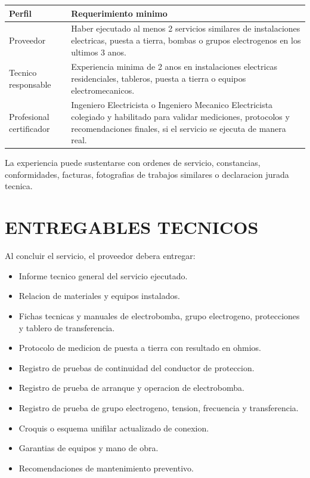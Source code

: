 \documentclass[12pt,letterpaper]{report}
\newcommand{\reqheader}{\rowcolor{modelblue!14}}
\begin{document}
\begin{table}[H]
\centering
\renewcommand{\arraystretch}{1.18}
\begin{tabularx}{\textwidth}{P{0.26\textwidth} L}
\toprule
\reqheader \textbf{Perfil} & \textbf{Requerimiento minimo} \\
\midrule
Proveedor & Haber ejecutado al menos 2 servicios similares de instalaciones electricas, puesta a tierra, bombas o grupos electrogenos en los ultimos 3 anos. \\
Tecnico responsable & Experiencia minima de 2 anos en instalaciones electricas residenciales, tableros, puesta a tierra o equipos electromecanicos. \\
Profesional certificador & Ingeniero Electricista o Ingeniero Mecanico Electricista colegiado y habilitado para validar mediciones, protocolos y recomendaciones finales, si el servicio se ejecuta de manera real. \\
\bottomrule
\end{tabularx}
\end{table}

La experiencia puede sustentarse con ordenes de servicio, constancias, conformidades, facturas, fotografias de trabajos similares o declaracion jurada tecnica.

\section{ENTREGABLES TECNICOS}

Al concluir el servicio, el proveedor debera entregar:

\begin{itemize}
  \item Informe tecnico general del servicio ejecutado.
  \item Relacion de materiales y equipos instalados.
  \item Fichas tecnicas y manuales de electrobomba, grupo electrogeno, protecciones y tablero de transferencia.
  \item Protocolo de medicion de puesta a tierra con resultado en ohmios.
  \item Registro de pruebas de continuidad del conductor de proteccion.
  \item Registro de prueba de arranque y operacion de electrobomba.
  \item Registro de prueba de grupo electrogeno, tension, frecuencia y transferencia.
  \item Croquis o esquema unifilar actualizado de conexion.
  \item Garantias de equipos y mano de obra.
  \item Recomendaciones de mantenimiento preventivo.
\end{itemize}
\end{document}
